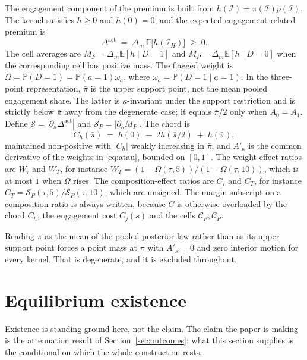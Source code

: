 \documentclass[11pt]{article}
\makeatletter
\newcommand{\compatlabel}[2]{\begingroup\phantomsection\def\@currentlabel{#1}\label{#2}\endgroup}
\newcommand{\Eop}{\mathbb{E}}
\newcommand{\Prb}{\mathbb{P}}
\newcommand{\Dact}{\Delta^{\mathrm{act}}}
\newcommand{\Akap}{A'_{\kappa}}
\makeatother
\begin{document}
The engagement component of the premium is built from
$h(\mathcal I)=\pi(\mathcal I)p(\mathcal I)$. The kernel satisfies $h\geq0$ and $h(0)=0$, and the
expected engagement-related premium is
\begin{equation}
\label{eq:Dact}
\Dact \;=\; \Delta_m\,\Eop\bigl[h(\mathcal I_H)\bigr] \;\ge\; 0.
\end{equation}
The cell averages are $M_F=\Delta_m\Eop[h\mid D=1]$ and $M_P=\Delta_m\Eop[h\mid D=0]$ when the
corresponding cell has positive mass. The flagged weight is $\Omega=\Prb(D=1)=\Prb(a=1)\omega_a$,
where $\omega_a=\Prb(D=1\mid a=1)$. In the three-point representation, $\bar\pi$ is the upper
support point, not the mean pooled engagement share. The latter is $\kappa$-invariant under the support
restriction and is strictly below $\bar\pi$ away from the degenerate case; it equals $\bar\pi/2$ only
when $A_0=A_1$. Define $\mathcal S=|\partial_\kappa\Dact|$ and
$\mathcal S_P=|\partial_\kappa M_P|$. The chord is
\begin{equation}
\label{eq:chord}
C_h(\bar\pi) \;=\; h(0) \;-\; 2h(\bar\pi/2) \;+\; h(\bar\pi),
\end{equation}
maintained non-positive with $|C_h|$ weakly increasing in $\bar\pi$, and $\Akap$ is the common
derivative of the weights in \eqref{eq:atau}, bounded on $[0,1]$. The weight-effect ratios are
$W_\tau$ and $W_T$, for instance $W_T = (1-\Omega(\tau,5))/(1-\Omega(\tau,10))$, which is at most
$1$ when $\Omega$ rises. The composition-effect ratios are $C_\tau$ and $C_T$, for instance
$C_T = \mathcal S_P(\tau,5)/\mathcal S_P(\tau,10)$, which are unsigned. The margin subscript on a
composition ratio is always written, because $C$ is otherwise overloaded by the chord $C_h$, the
engagement cost $C_j(s)$ and the cells $\mathcal C_F,\mathcal C_P$.\compatlabel{7}{def:premium}

Reading $\bar\pi$ as the mean of the pooled posterior law rather than as its upper support point
forces a point mass at $\bar\pi$ with $\Akap = 0$ and zero interior motion for every kernel. That is
degenerate, and it is excluded throughout.

\section{Equilibrium existence}
\label{sec:existence}

Existence is standing ground here, not the claim. The claim the paper is making is the attenuation
result of Section~\ref{sec:outcomes}; what this section supplies is the conditional on which the
whole construction rests.
\end{document}
